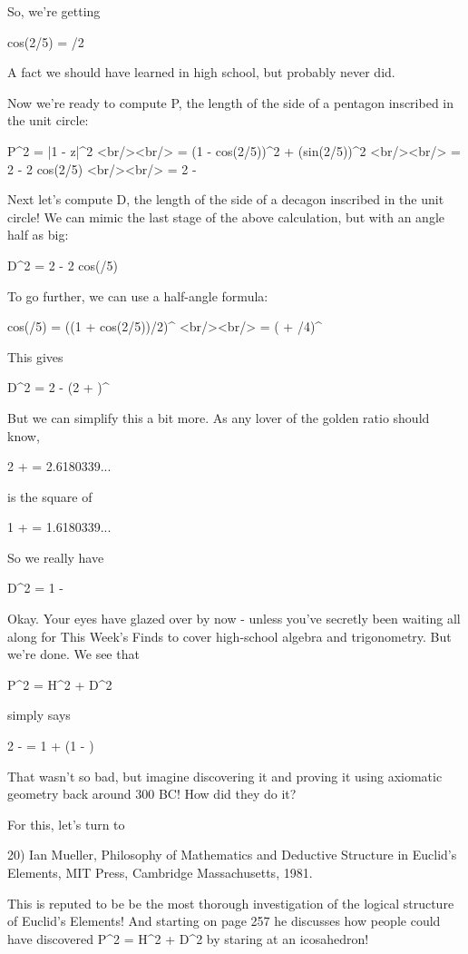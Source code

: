 So, we're getting

cos(2\pi /5) = \phi /2

A fact we should have learned in high school, but probably never did.

Now we're ready to compute P, the length of the side of a pentagon
inscribed in the unit circle:

P^{2} = |1 - z|^{2}   <br/><br/>
      = (1 - cos(2\pi /5))^{2} + (sin(2\pi /5))^{2}   <br/><br/>
        = 2 - 2 cos(2\pi /5)   <br/><br/>
         = 2 - \phi 

Next let's compute D, the length of the side of a decagon inscribed
in the unit circle!   We can mimic the last stage of the above 
calculation, but with an angle half as big:

D^{2} = 2 - 2 cos(\pi /5)

To go further, we can use a half-angle formula:

cos(\pi /5) = ((1 + cos(2\pi /5))/2)^{ } <br/><br/>
              = (  + \phi /4)^{ }

This gives

D^{2} = 2 - (2 + \phi )^{ }

But we can simplify this a bit more.  As any lover of the golden ratio 
should know, 

2 + \phi  = 2.6180339...

is the square of 

1 + \phi  = 1.6180339...

So we really have

D^{2} = 1 - \phi 

Okay.  Your eyes have glazed over by now - unless you've secretly been
waiting all along for This Week's Finds to cover high-school algebra
and trigonometry.  But we're done.  We see that

P^{2} = H^{2} + D^{2}

simply says

2 - \phi  = 1 + (1 - \phi )

That wasn't so bad, but imagine discovering it and proving it using 
axiomatic geometry back around 300 BC!  How did they do it?

For this, let's turn to

20) Ian Mueller, Philosophy of Mathematics and Deductive Structure in 
Euclid's Elements, MIT Press, Cambridge Massachusetts, 1981.

This is reputed to be be the most thorough investigation of the 
logical structure of Euclid's Elements!  And starting on page 257 he
discusses how people could have discovered P^{2} = 
H^{2} + D^{2} by staring at
an icosahedron!  

